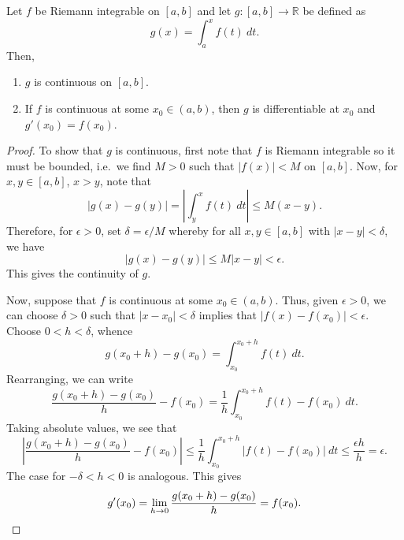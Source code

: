 \documentclass[11pt]{article}
\def\R{\mathbb{R}}
\theoremstyle{definition}
\theoremstyle{remark}
\numberwithin{equation}{module}
\begin{document}
    \begin{theorem}
        Let $f$ be Riemann integrable on $[a, b]$ and let $g\colon [a, b] \to \R$ be
        defined as \[
            g(x) = \int_a^x f(t)\:dt.
        \] Then, 
        \begin{enumerate}
            \itemsep0em
            \item $g$ is continuous on $[a, b]$.
            \item If $f$ is continuous at some $x_0 \in (a, b)$, then $g$ is
            differentiable at $x_0$ and $g'(x_0) = f(x_0)$.
        \end{enumerate}
    \end{theorem}
    \begin{proof}
        To show that $g$ is continuous, first note that $f$ is Riemann integrable so
        it must be bounded, i.e.\ we find $M > 0$ such that $|f(x)| < M$ on $[a,
        b]$. Now, for $x, y \in [a, b]$, $x > y$, note that \[
            |g(x) - g(y)| = |\int_y^x f(t)\:dt| \leq M(x - y).
        \] Therefore, for $\epsilon > 0$, set $\delta = \epsilon / M$ whereby for
        all $x, y \in [a, b]$ with $|x - y| < \delta$, we have \[
            |g(x) - g(y)| \leq M|x - y| < \epsilon.
        \] This gives the continuity of $g$.

        \noindent Now, suppose that $f$ is continuous at some $x_0 \in (a, b)$.
        Thus, given $\epsilon > 0$, we can choose $\delta > 0$ such that $|x - x_0| <
        \delta$ implies that $|f(x) - f(x_0)| < \epsilon$. Choose $0 < h < \delta$,
        whence \[
            g(x_0 + h) - g(x_0) = \int_{x_0}^{x_0 + h}f(t)\:dt.
        \] Rearranging, we can write \[
            \frac{g(x_0 + h) - g(x_0)}{h} - f(x_0) = \frac{1}{h}\int_{x_0}^{x_0 + h}
            f(t) - f(x_0)\:dt.
        \] Taking absolute values, we see that \[
            \left|\frac{g(x_0 + h) - g(x_0)}{h} - f(x_0)\right| \leq 
            \frac{1}{h}\int_{x_0}^{x_0 + h} |f(t) - f(x_0)| \:dt \leq \frac{\epsilon
            h}{h} = \epsilon.
        \] The case for $-\delta < h < 0$ is analogous. This gives \[
            g'(x_0) = \lim_{h \to 0} \frac{g(x_0 + h) - g(x_0)}{h} = f(x_0). \qedhere
        \] 
    \end{proof}
\end{document}

